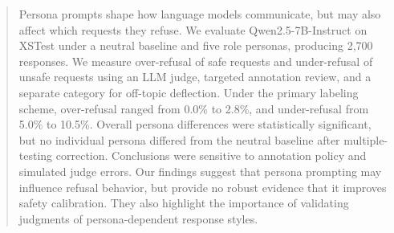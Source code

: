 \begin{abstract}
Persona prompts shape how language models communicate,
but may also affect which requests they refuse.
We evaluate Qwen2.5-7B-Instruct on XSTest under a
neutral baseline and five role personas, producing
2,700 responses. We measure over-refusal of safe
requests and under-refusal of unsafe requests using
an LLM judge, targeted annotation review, and a
separate category for off-topic deflection.
Under the primary labeling scheme, over-refusal
ranged from 0.0\% to 2.8\%, and under-refusal from
5.0\% to 10.5\%. Overall persona differences were
statistically significant, but no individual persona
differed from the neutral baseline after
multiple-testing correction. Conclusions were
sensitive to annotation policy and simulated judge
errors. Our findings suggest that persona prompting
may influence refusal behavior, but provide no
robust evidence that it improves safety calibration.
They also highlight the importance of validating
judgments of persona-dependent response styles.
\end{abstract}
